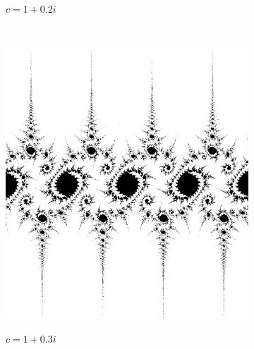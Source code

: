 \begin{figure}[!htb]
\begin{subfigure}{1.0\textwidth}
    \label{fig:julia3}
    \caption{$c=1+0.2i$}
\end{subfigure}    
    \endminipage
    \hfill \\ %
        \begin{subfigure}{1.0\textwidth}
        \includegraphics[width=\linewidth]{./images/opencal/julia4.png}
        \label{fig:julia4}
        \caption{$c=1+0.3i$}
    \end{subfigure}
    \endminipage\hfill
        \begin{subfigure}{1.0\textwidth}

\end{subfigure}
\end{figure}

